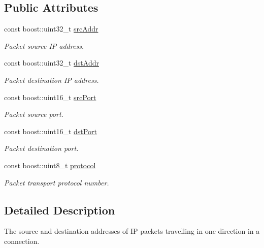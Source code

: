 \subsection*{\-Public \-Attributes}
\begin{DoxyCompactItemize}
\item 
const boost\-::uint32\-\_\-t \hyperlink{structNERD_1_1ConnectionServer_1_1AddressPair_a96cf9e68f77b3c0894cc70be7440c230}{src\-Addr}
\begin{DoxyCompactList}\small\item\em \-Packet source \-I\-P address. \end{DoxyCompactList}\item 
const boost\-::uint32\-\_\-t \hyperlink{structNERD_1_1ConnectionServer_1_1AddressPair_a820ebb84f573dc37a49261ab707d435f}{dst\-Addr}
\begin{DoxyCompactList}\small\item\em \-Packet destination \-I\-P address. \end{DoxyCompactList}\item 
const boost\-::uint16\-\_\-t \hyperlink{structNERD_1_1ConnectionServer_1_1AddressPair_ae4d253c1b72fe3424484d5d02a38c073}{src\-Port}
\begin{DoxyCompactList}\small\item\em \-Packet source port. \end{DoxyCompactList}\item 
const boost\-::uint16\-\_\-t \hyperlink{structNERD_1_1ConnectionServer_1_1AddressPair_ad2962570ad683405d91087e11f78aeea}{dst\-Port}
\begin{DoxyCompactList}\small\item\em \-Packet destination port. \end{DoxyCompactList}\item 
const boost\-::uint8\-\_\-t \hyperlink{structNERD_1_1ConnectionServer_1_1AddressPair_a298c525bf23bb1ccec0d7d1b2b4ee2db}{protocol}
\begin{DoxyCompactList}\small\item\em \-Packet transport protocol number. \end{DoxyCompactList}\end{DoxyCompactItemize}


\subsection{\-Detailed \-Description}
\-The source and destination addresses of \-I\-P packets travelling in one direction in a connection. 

